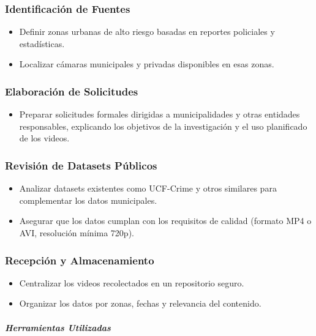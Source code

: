 \documentclass[listof=nochaptergap,12pt,times,authoryear]{report}
\begin{document}
\subsubsection{Identificación de Fuentes}

\begin{itemize}
    \item Definir zonas urbanas de alto riesgo basadas en reportes policiales y estadísticas.
    \item Localizar cámaras municipales y privadas disponibles en esas zonas.
\end{itemize}

\subsubsection{Elaboración de Solicitudes}
\begin{itemize}
    \item Preparar solicitudes formales dirigidas a municipalidades y otras entidades responsables, explicando los objetivos de la investigación y el uso planificado de los videos.
\end{itemize}

\subsubsection{Revisión de Datasets Públicos}
\begin{itemize}
    \item Analizar datasets existentes como UCF-Crime y otros similares para complementar los datos municipales.
    \item Asegurar que los datos cumplan con los requisitos de calidad (formato MP4 o AVI, resolución mínima 720p).
\end{itemize}

\subsubsection{Recepción y Almacenamiento}
\begin{itemize}
    \item Centralizar los videos recolectados en un repositorio seguro.
    \item Organizar los datos por zonas, fechas y relevancia del contenido.
\end{itemize}


\paragraph{\textit{Herramientas Utilizadas}}
\end{document}
